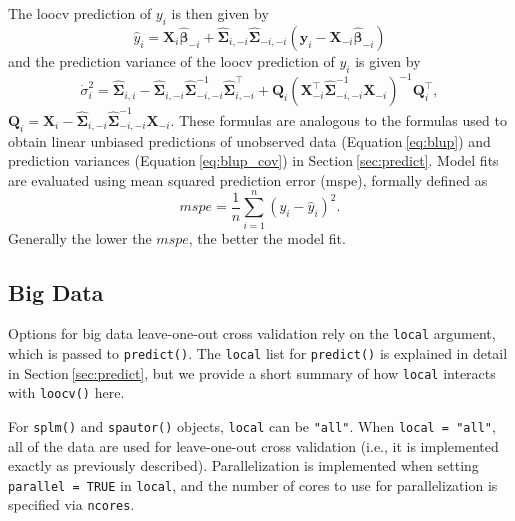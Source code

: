 \documentclass[10pt,letterpaper]{article}
\begin{document}
The loocv prediction of \(y_i\) is then given by \begin{equation*}
  \hat{y}_i = \mathbf{X}_i \hat{\boldsymbol{\beta}}_{-i} + \hat{\boldsymbol{\Sigma}}_{i, -i}\hat{\boldsymbol{\Sigma}}_{-i, -i}(\mathbf{y}_i - \mathbf{X}_{-i} \hat{\boldsymbol{\beta}}_{-i})
\end{equation*} and the prediction variance of the loocv prediction of
\(y_i\) is given by \begin{equation*}
  \dot{\sigma}^2_i = \hat{\boldsymbol{\Sigma}}_{i, i} - \hat{\boldsymbol{\Sigma}}_{i, - i} \hat{\boldsymbol{\Sigma}}^{-1}_{-i, -i} \hat{\boldsymbol{\Sigma}}_{i, - i}^\top + \mathbf{Q}_i(\mathbf{X}_{-i}^\top \hat{\boldsymbol{\Sigma}}_{-i, -i}^{-1} \mathbf{X}_{-i})^{-1}\mathbf{Q}_i^\top ,
\end{equation*}
\(\mathbf{Q}_i = \mathbf{X}_i - \hat{\boldsymbol{\Sigma}}_{i, -i} \hat{\boldsymbol{\Sigma}}^{-1}_{-i, -i} \mathbf{X}_{-i}\).
These formulas are analogous to the formulas used to obtain linear
unbiased predictions of unobserved data (Equation\(~\)\ref{eq:blup}) and
prediction variances (Equation\(~\)\ref{eq:blup_cov}) in
Section\(~\)\ref{sec:predict}. Model fits are evaluated using mean
squared prediction error (mspe), formally defined as \begin{equation*}
 mspe = \frac{1}{n}\sum_{i = 1}^n(y_i - \hat{y}_i)^2.
\end{equation*} Generally the lower the \(mspe\), the better the model
fit.

\hypertarget{big-data}{%
\subsection{Big Data}\label{big-data}}

Options for big data leave-one-out cross validation rely on the
\texttt{local} argument, which is passed to \texttt{predict()}. The
\texttt{local} list for \texttt{predict()} is explained in detail in
Section\(~\)\ref{sec:predict}, but we provide a short summary of how
\texttt{local} interacts with \texttt{loocv()} here.

For \texttt{splm()} and \texttt{spautor()} objects, \texttt{local} can
be \texttt{"all"}. When \texttt{local\ =\ "all"}, all of the data are
used for leave-one-out cross validation (i.e., it is implemented exactly
as previously described). Parallelization is implemented when setting
\texttt{parallel\ =\ TRUE} in \texttt{local}, and the number of cores to
use for parallelization is specified via \texttt{ncores}.
\end{document}
